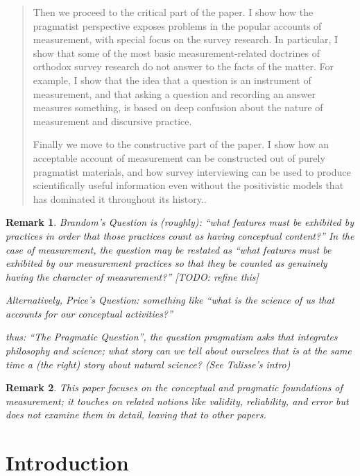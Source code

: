 \documentclass[11pt,twoside]{article}
\newtheorem{remark}{Remark}
\begin{document}
\begin{abstract}
  Then we proceed to the critical part of the paper.  I show how the
  pragmatist perspective exposes problems in the popular accounts of
  measurement, with special focus on the survey research.  In
  particular, I show that some of the most basic measurement-related
  doctrines of orthodox survey research do not answer to the facts of
  the matter.  For example, I show that the idea that a question is an
  instrument of measurement, and that asking a question and recording
  an answer measures something, is based on deep confusion about the
  nature of measurement and discursive practice.

  Finally we move to the constructive part of the paper.  I show how
  an acceptable account of measurement can be constructed out of
  purely pragmatist materials, and how survey interviewing can be used
  to produce scientifically useful information even without the
  positivistic models that has dominated it throughout its history..
\end{abstract}

\begin{remark}
Brandom's Question is (roughly): ``what features must be exhibited by
practices in order that those practices count as having conceptual
content?''  In the case of measurement, the question may be restated
as ``what features must be exhibited by our measurement practices so
that they be counted as genuinely having the character of
measurement?'' [TODO: refine this]

Alternatively, Price's Question: something like ``what is the science
of us that accounts for our conceptual activities?''

thus: ``The Pragmatic Question'', the question pragmatism asks that
integrates philosophy and science; what story can we tell about
ourselves that is at the same time a (the right) story about natural
science?  (See Talisse's intro)
\end{remark}

\begin{remark}
  This paper focuses on the conceptual and pragmatic foundations of
  measurement; it touches on related notions like validity,
  reliability, and error but does not examine them in detail, leaving
  that to other papers.
\end{remark}

\tableofcontents
\listoffigures

\clearpage
\section{Introduction}
\end{document}
